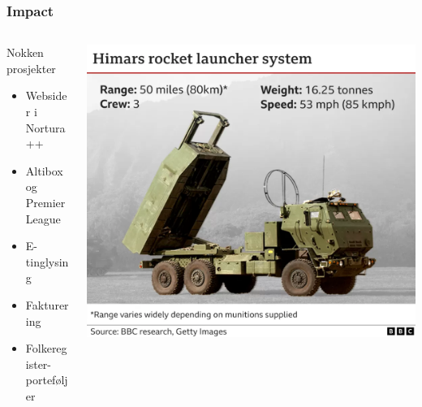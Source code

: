 \documentclass{beamer}
\begin{document}
    \begin{frame}
        \frametitle{Impact}
        \begin{columns}[c]
            \begin{column}{.55\textwidth}
                \begin{block}{Nokken prosjekter}
                    \begin{itemize}
                        \item Websider i Nortura++
                        \item Altibox og Premier League
                        \item E-tinglysing
                        \item Fakturering
                        \item Folkeregister-porteføljer
                    \end{itemize}
                \end{block}
            \end{column}
            \begin{column}{.45\textwidth}
                \begin{center}
                    \includegraphics[width=\textwidth]{images/himars}
                \end{center}
            \end{column}
        \end{columns}
    \end{frame}
\end{document}
